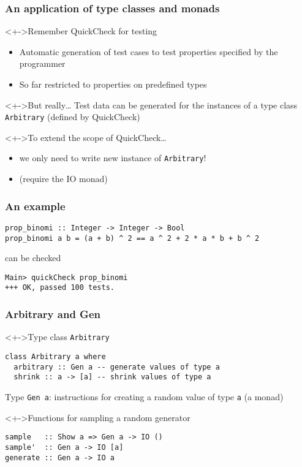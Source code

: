 \documentclass{beamer}
\subtitle{Test data generators}
\begin{document}
\begin{frame}
  \titlepage
\end{frame}
\begin{frame}[fragile]
  \frametitle{An application of type classes and monads}
  \begin{block}<+->{Remember QuickCheck for testing}
    \begin{itemize}
    \item Automatic generation of test cases to test properties specified by the programmer
    \item So far restricted to properties on predefined types
    \end{itemize}
  \end{block}
  \begin{block}<+->{But really\dots}
    Test data can be generated for the instances of a type class \texttt{Arbitrary} (defined by QuickCheck) 
  \end{block}
  \begin{block}<+->{To extend the scope of QuickCheck\dots}
    \begin{itemize}
    \item we only need to write new instance of \texttt{Arbitrary}!
    \item (require the IO monad)
    \end{itemize}
  \end{block}
\end{frame}
\begin{frame}[fragile]
  \frametitle{An example}
\begin{verbatim}
prop_binomi :: Integer -> Integer -> Bool
prop_binomi a b = (a + b) ^ 2 == a ^ 2 + 2 * a * b + b ^ 2
\end{verbatim}
  can be checked
\begin{verbatim}
Main> quickCheck prop_binomi
+++ OK, passed 100 tests.
\end{verbatim}
\end{frame}
\begin{frame}[fragile]
  \frametitle{Arbitrary and Gen}
  \begin{block}<+->{Type class \texttt{Arbitrary}}
\begin{verbatim}
class Arbitrary a where
  arbitrary :: Gen a -- generate values of type a
  shrink :: a -> [a] -- shrink values of type a
\end{verbatim}
    Type \texttt{Gen a}: instructions for creating a random value of type \texttt{a} (a monad)
  \end{block}
  \begin{block}<+->{Functions for sampling a random generator}
\begin{verbatim}
sample   :: Show a => Gen a -> IO ()
sample'  :: Gen a -> IO [a]
generate :: Gen a -> IO a
\end{verbatim}
  \end{block}
\end{frame}
\end{document}
